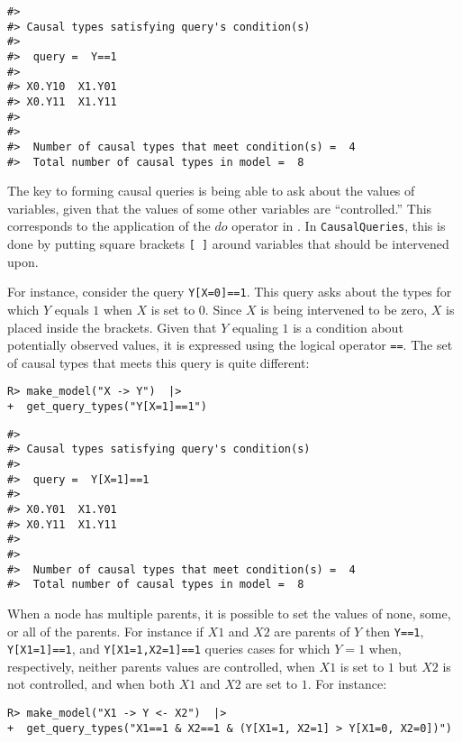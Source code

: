 \documentclass[
  11pt,
  article]{jss}
\begin{document}
\begin{verbatim}
#> 
#> Causal types satisfying query's condition(s)  
#> 
#>  query =  Y==1 
#> 
#> X0.Y10  X1.Y01
#> X0.Y11  X1.Y11
#> 
#> 
#>  Number of causal types that meet condition(s) =  4
#>  Total number of causal types in model =  8
\end{verbatim}

The key to forming causal queries is being able to ask about the values
of variables, given that the values of some other variables are
``controlled.'' This corresponds to the application of the \(do\)
operator in \citet{pearl_causality_2009}. In \texttt{CausalQueries},
this is done by putting square brackets \texttt{{[}\ {]}} around
variables that should be intervened upon.

For instance, consider the query \texttt{Y{[}X=0{]}==1}. This query asks
about the types for which \(Y\) equals \(1\) when \(X\) is set to \(0\).
Since \(X\) is being intervened to be zero, \(X\) is placed inside the
brackets. Given that \(Y\) equaling \(1\) is a condition about
potentially observed values, it is expressed using the logical operator
\texttt{==}. The set of causal types that meets this query is quite
different:

\begin{verbatim}
R> make_model("X -> Y")  |> 
+  get_query_types("Y[X=1]==1")
\end{verbatim}

\begin{verbatim}
#> 
#> Causal types satisfying query's condition(s)  
#> 
#>  query =  Y[X=1]==1 
#> 
#> X0.Y01  X1.Y01
#> X0.Y11  X1.Y11
#> 
#> 
#>  Number of causal types that meet condition(s) =  4
#>  Total number of causal types in model =  8
\end{verbatim}

When a node has multiple parents, it is possible to set the values of
none, some, or all of the parents. For instance if \(X1\) and \(X2\) are
parents of \(Y\) then \texttt{Y==1}, \texttt{Y{[}X1=1{]}==1}, and
\texttt{Y{[}X1=1,X2=1{]}==1} queries cases for which \(Y=1\) when,
respectively, neither parents values are controlled, when \(X1\) is set
to \(1\) but \(X2\) is not controlled, and when both \(X1\) and \(X2\)
are set to \(1\). For instance:

\begin{verbatim}
R> make_model("X1 -> Y <- X2")  |>
+  get_query_types("X1==1 & X2==1 & (Y[X1=1, X2=1] > Y[X1=0, X2=0])")
\end{verbatim}
\end{document}

